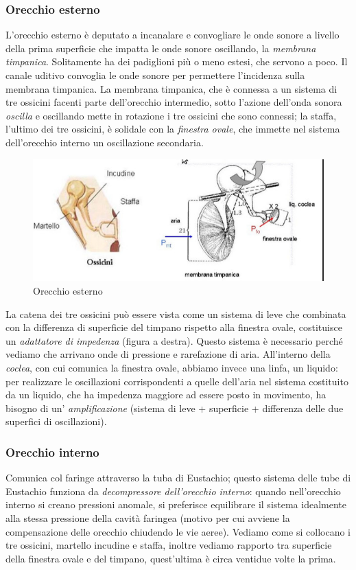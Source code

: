 \documentclass[a4paper,12pt]{article}
\begin{document}
\subsubsection{Orecchio esterno}
L'orecchio esterno è deputato a incanalare e convogliare le onde sonore a livello della prima superficie che impatta le onde sonore oscillando, la \emph{membrana timpanica}. Solitamente ha dei padiglioni più o meno estesi, che servono a poco. Il canale uditivo convoglia le onde sonore per permettere l'incidenza sulla membrana timpanica. La membrana timpanica, che è connessa a un sistema di tre ossicini facenti parte dell'orecchio intermedio, sotto l'azione dell'onda sonora \emph{oscilla} e oscillando mette in rotazione i tre ossicini che sono connessi; la staffa, l'ultimo dei tre ossicini, è solidale con la \emph{finestra ovale}, che immette nel sistema dell'orecchio interno un oscillazione secondaria. 
\begin{figure}[H]
\centering
\includegraphics[scale=0.6]{immagine/esterno.jpg}
\caption{Orecchio esterno}
\end{figure}

La catena dei tre ossicini può essere vista come un sistema di leve che combinata con la differenza di superficie del timpano rispetto alla finestra ovale, costituisce un  \emph{adattatore di impedenza} (figura a destra). Questo sistema è necessario perché vediamo che arrivano onde di pressione e rarefazione di aria. All'interno della \emph{coclea}, con cui comunica la finestra ovale, abbiamo invece una linfa, un liquido: per realizzare le oscillazioni corrispondenti a quelle dell'aria nel sistema costituito da un liquido, che ha impedenza maggiore ad essere posto in movimento, ha bisogno di un' \emph{amplificazione} (sistema di leve + superficie + differenza delle due superfici di oscillazioni).
 
\subsubsection{Orecchio interno}
Comunica col faringe attraverso la tuba di Eustachio; questo sistema delle tube di Eustachio funziona da \emph{decompressore dell'orecchio interno}: quando nell'orecchio interno si creano pressioni anomale, si preferisce equilibrare il sistema idealmente alla stessa pressione della cavità faringea (motivo per cui avviene la compensazione delle orecchio chiudendo le vie aeree). Vediamo come si collocano i tre ossicini, martello incudine e staffa, inoltre vediamo rapporto tra superficie della finestra ovale e del timpano, quest'ultima è circa ventidue volte la prima.
\end{document}
